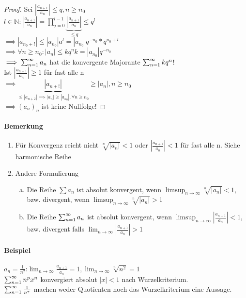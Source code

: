 \begin{proof}
Sei $|\frac{a_{n+1}}{a_n}| \leq q, n \geq n_0$\\
$l \in \mathbb{N}: |\frac{a_{n+1}}{a_n}| = \prod_{j=0}^{l-1} \underbrace{|\frac{a_{n+1}}{a_n}|}_{\leq q} \leq q^l$\\
$\implies |a_{n_0 + l}| \leq |a_{n_0}|a^l = |a_{n_0}|q^{-n_0} * q^{n_0 + l}$\\
$\implies \forall n \geq n_0: |a_n| \leq k q^n k = |a_{n_0}| q^{-n_0}$\\
$\implies \sum_{n=1}^{\infty} a_n$ hat die konvergente Majorante $\sum_{n=1}^{\infty} k q^n$!\\
Ist $|\frac{a_{n+1}}{a_n}| \geq 1$ für fast alle n\\
$\implies \underbrace{|a_{n+!}|}_{\leq |a_{n+2}| \implies |a_n| \geq |a_{n_0}|, \forall n\geq n_0} \geq |a_n|, n \geq n_0$\\
$\implies (a_n)_n$ ist keine Nullfolge!
\end{proof}
\paragraph{Bemerkung}
\begin{enumerate}[1)]
  \item Für Konvergenz reicht nicht $\sqrt[n]{|a_n|} < 1$ oder $|\frac{a_{n+1}}{a_n}| < 1$ für fast alle n. Siehe harmonische Reihe
  \item Andere Formulierung
\begin{enumerate}[a)]
  \item Die Reihe $\sum a_n$ ist absolut konvergent, wenn $\limsup_{n\rightarrow\infty} \sqrt[n]{|a_n|} < 1$, bzw. divergent, wenn $\limsup_{n\rightarrow\infty} \sqrt[n]{|a_n|} > 1$
  \item Die Reihe $\sum_{n=1}^{\infty} a_n$ ist absolut konvergent, wenn $\limsup_{n\rightarrow\infty} |\frac{a_{n+1}}{a_n}| < 1$, bzw. divergent falls $\lim_{n\rightarrow\infty} |\frac{a_{n+1}}{a_n}| > 1$
\end{enumerate}
\end{enumerate}
\paragraph{Beispiel}$ $\\
$a_n = \frac{1}{n^2}$:$\lim_{n\rightarrow\infty} \frac{a_{n+1}}{a_n} = 1, \lim_{n\rightarrow\infty} \sqrt[n]{n^2} = 1$\\
$\sum_{n=1}^{\infty} n^px^n$ konvergiert absolut $|x|<1$ nach Wurzelkriterium.\\
$\sum_{n=1}^{\infty} \frac{1}{n^\gamma}$ machen weder Quotienten noch das Wurzelkriterium eine Aussage.

